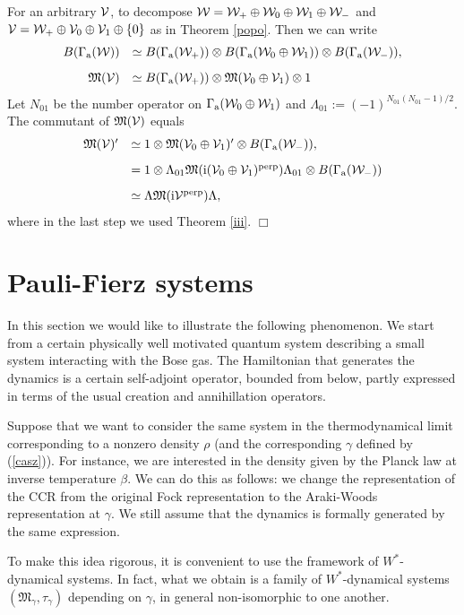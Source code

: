 \documentclass{svmult}
\def\PF{{}}
\def\perpr{{\rm perp}}
\def\cV{{\cal V}}
\def\cW{{\cal W}}
\def\fM{{\mathfrak M}}
\def\a{{\rm a}}
\def\i{{\rm i}}
\def\qed{$\Box$\medskip}
\def\one{{\bf 1}}
\def\one{{ 1}}
\def\W{{\cal W}}
\begin{document}
For an arbitrary $\cV$, to decompose $\cW=\W_+\oplus\cW_0\oplus\cW_1
\oplus\cW_-$ and
$\cV=\cW_+\oplus\cV_0\oplus\cV_1\oplus\{0\}$ as in
 Theorem \ref{popo}.
Then we can write
\[\begin{array}{rl}
B(\Gamma_\a(\cW))&\simeq B(\Gamma_\a(\cW_+))\otimes
B(\Gamma_\a(\cW_0\oplus\cW_1 ))
\otimes B(\Gamma_\a(\cW_-)),\\[3mm]
\fM(\cV)&\simeq B(\Gamma_\a(\cW_+))\otimes \fM(\cV_0\oplus\cV_1)\otimes\one
\end{array}\]
Let $N_{01}$ be the number operator on 
$\Gamma_\a(\cW_0\oplus\cW_1)$ and $\Lambda_{01}:=(-1)^{N_{01}(N_{01}-1)/2}$.
The commutant of 
$\fM(\cV)$ equals 
\[\begin{array}{rl}
\fM(\cV)'
&\simeq \one\otimes\fM(\cV_0\oplus\cV_1)'\otimes B(\Gamma_\a(\cW_-)),\\[3mm]
&=\one\otimes\Lambda_{01}
\fM(\i(\cV_0\oplus\cV_1)^\perpr)\Lambda_{01}\otimes
B(\Gamma_\a(\cW_-))\\[3mm] 
&\simeq\Lambda\fM(\i\cV^\perpr)\Lambda,\end{array}\]
where in the last step we used Theorem \ref{iii}.
\qed




\section{Pauli-Fierz systems}





In this section
 we would like to illustrate the following phenomenon. We start from a
certain physically well motivated quantum system describing a small system
 interacting with the Bose gas. The Hamiltonian that generates the dynamics
 is a certain self-adjoint operator,  bounded from below,
 partly 
expressed in terms of
 the usual creation and annihillation operators.

Suppose that we want to consider the same system in the thermodynamical limit
corresponding to a nonzero  density $\rho$ (and the corresponding $\gamma$ 
defined by (\ref{casz})).
For instance, we are interested in  the density given by the
Planck law at inverse temperature $\beta$. 
We can do this as follows:
 we change the representation of the CCR from the original Fock representation
to the Araki-Woods representation at  $\gamma$. We still assume that
 the dynamics is  formally generated by the same expression.



To make this idea rigorous, it is convenient to use
 the framework of 
$W^*$-dynamical systems. In fact, what we obtain is a family of
$W^*$-dynamical systems $(\fM_\gamma^\PF,\tau_\gamma)$ depending on $\gamma$,
 in general non-isomorphic to one another.
\end{document}
